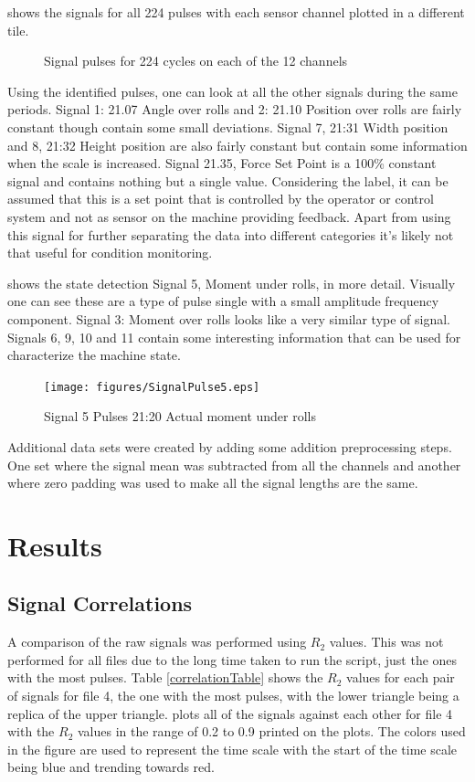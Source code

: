 \documentclass[]{article}
\begin{document}
 shows the signals for all 224 pulses with each sensor channel plotted in a different tile. 
\begin{figure}[H]
    \caption{Signal pulses for 224 cycles on each of the 12 channels}
    \label{fig:SignalPulses}
\end{figure}

Using the identified pulses, one can look at all the other signals during the same periods. Signal 1: 21.07 Angle over rolls and 2: 21.10 Position over rolls are fairly constant though contain some small deviations. Signal 7, 21:31 Width position and 8, 21:32 Height position are also fairly constant but contain some information when the scale is increased. Signal 21.35, Force Set Point is a 100\% constant signal and contains nothing but a single value. Considering the label, it can be assumed that this is a set point that is controlled by the operator or control system and not as sensor on the machine providing feedback. Apart from using this signal for further separating the data into different categories it's likely not that useful for condition monitoring.

 shows the state detection Signal 5, Moment under rolls, in more detail. Visually one can see these are a type of pulse single with a small amplitude frequency component. Signal 3: Moment over rolls looks like a very similar type of signal. Signals 6, 9, 10 and 11 contain some interesting information that can be used for characterize the machine state.

\begin{figure}[H]
    \centering
    \texttt{[image: figures/SignalPulse5.eps]}
    \caption{Signal 5 Pulses 21:20 Actual moment under rolls}
    \label{fig:SignalPulse5}
\end{figure}

Additional data sets were created by adding some addition preprocessing steps. One set where the signal mean was subtracted from all the channels and another where zero padding was used to make all the signal lengths are the same. 

\section{Results}
\subsection{Signal Correlations}
A comparison of the raw signals was performed using $R_2$ values. This was not performed for all files due to the long time taken to run the script, just the ones with the most pulses. Table \ref{correlationTable} shows the $R_2$ values for each pair of signals for file 4, the one with the most pulses, with the lower triangle being a replica of the upper triangle.  plots all of the signals against each other for file 4 with the $R_2$ values in the range of 0.2 to 0.9 printed on the plots. The colors used in the figure are used to represent the time scale with the start of the time scale being blue and trending towards red.
\end{document}
